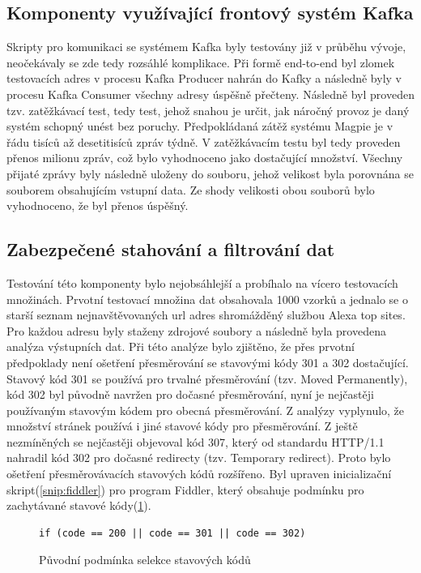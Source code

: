 \documentclass[thesis=M,czech,hidelinks]{FITthesis}[2013/05/06]
\begin{document}
\subsection{Komponenty využívající frontový systém Kafka}
Skripty pro komunikaci se systémem Kafka byly testovány již v průběhu vývoje, neočekávaly se zde tedy rozsáhlé komplikace. Při formě end-to-end byl zlomek testovacích adres v procesu Kafka Producer nahrán do Kafky a následně byly v procesu Kafka Consumer všechny adresy úspěšně přečteny. Následně byl proveden tzv. zatěžkávací test, tedy test, jehož snahou je určit, jak náročný provoz je daný systém schopný unést bez poruchy. Předpokládaná zátěž systému Magpie je v řádu tisíců až desetitisíců zpráv týdně. V zatěžkávacím testu byl tedy proveden přenos milionu zpráv, což bylo vyhodnoceno jako dostačující množství. Všechny přijaté zprávy byly následně uloženy do souboru, jehož velikost byla porovnána se souborem obsahujícím vstupní data. Ze shody velikosti obou souborů bylo vyhodnoceno, že byl přenos úspěšný.


\subsection{Zabezpečené stahování a filtrování dat}
Testování této komponenty bylo nejobsáhlejší a probíhalo na vícero testovacích množinách. Prvotní testovací množina dat obsahovala 1000 vzorků a jednalo se o starší seznam nejnavštěvovaných url adres shromážděný službou Alexa top sites\cite{alexa}. Pro každou adresu byly staženy zdrojové soubory a následně byla provedena analýza výstupních dat. Při této analýze bylo zjištěno, že přes prvotní předpoklady není ošetření přesměrování se stavovými kódy 301 a 302 dostačující. Stavový kód 301 se používá pro trvalné přesměrování (tzv. Moved Permanently), kód 302 byl původně navržen pro dočasné přesměrování, nyní je nejčastěji používaným stavovým kódem pro obecná přesměrování. Z analýzy vyplynulo, že množství stránek používá i jiné stavové kódy pro přesměrování. Z ještě nezmíněných se nejčastěji objevoval kód 307, který od standardu HTTP/1.1 nahradil kód 302 pro dočasné redirecty (tzv. Temporary redirect). Proto bylo ošetření přesměrovávacích stavových kódů rozšířeno. Byl upraven inicializační skript(\ref{snip:fiddler}) pro program Fiddler, který obsahuje podmínku pro zachytávané stavové kódy(\ref{snip:fiddler_new}). 

\begin{figure}[h]               
	\begin{verbatim}
if (code == 200 || code == 301 || code == 302)
	\end{verbatim}      
	\caption{Původní podmínka selekce stavových kódů}
	\label{snip:fiddler_new}
\end{figure}
\end{document}
